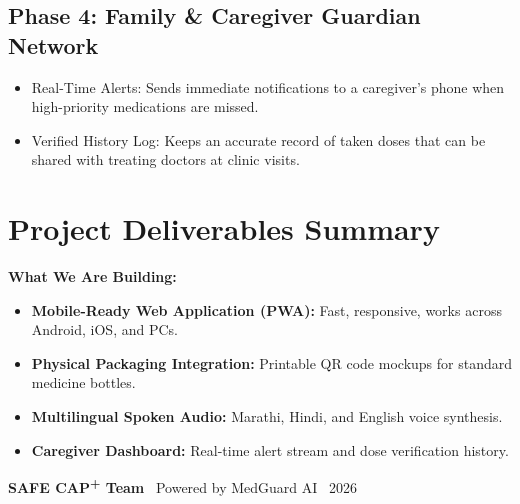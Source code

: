 \documentclass[11pt,a4paper]{article}
\begin{document}
\subsection{Phase 4: Family \& Caregiver Guardian Network}
\begin{itemize}[leftmargin=*,itemsep=2pt]
    \item Real-Time Alerts: Sends immediate notifications to a caregiver's phone when high-priority medications are missed.
    \item Verified History Log: Keeps an accurate record of taken doses that can be shared with treating doctors at clinic visits.
\end{itemize}

\section{Project Deliverables Summary}
\begin{tcolorbox}[colback=successgreen!5,colframe=successgreen]
\textbf{\textcolor{successgreen}{What We Are Building:}}
\begin{itemize}[itemsep=2pt]
    \item[\checkmark] \textbf{Mobile-Ready Web Application (PWA):} Fast, responsive, works across Android, iOS, and PCs.
    \item[\checkmark] \textbf{Physical Packaging Integration:} Printable QR code mockups for standard medicine bottles.
    \item[\checkmark] \textbf{Multilingual Spoken Audio:} Marathi, Hindi, and English voice synthesis.
    \item[\checkmark] \textbf{Caregiver Dashboard:} Real-time alert stream and dose verification history.
\end{itemize}
\end{tcolorbox}

\vspace{0.4cm}
\begin{center}
    \small \textcolor{secondary}{\textbf{SAFE CAP\textsuperscript{+} Team} \textbullet\ Powered by MedGuard AI \textbullet\ 2026}
\end{center}
\end{document}
